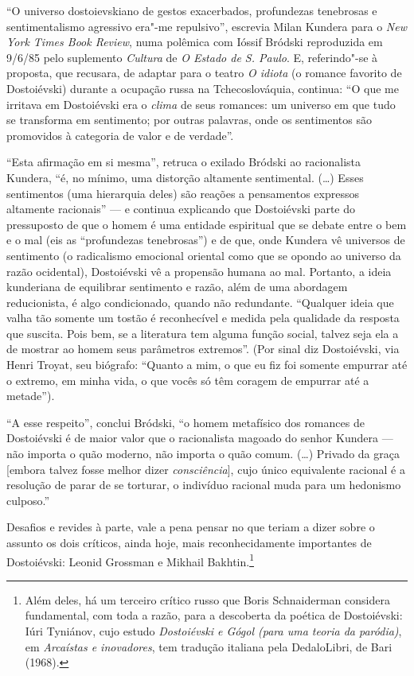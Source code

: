 {{``O universo dostoievskiano de gestos exacerbados, profundezas
tenebrosas e sentimen­talismo agressivo era"-me repulsivo'', escrevia
Milan Kundera para o \emph{New York Times Book Review}, numa polêmica
com Ióssif Bródski reproduzida em 9/6/85 pelo suplemento \emph{Cultura}
de \emph{O Estado de S. Paulo}. E, referindo"-se à proposta, que
recusara, de adaptar para o teatro \emph{O idiota} (o romance favorito
de Dostoiévski) durante a ocupação russa na Tchecoslováquia, continua:
``O que me irritava em Dostoiévski era o \emph{clima} de seus romances:
um universo em que tudo se transforma em sentimento; por outras
palavras, onde os sentimentos são promovidos à categoria de valor e de
verdade''.

``Esta afirmação em si mesma'', retruca o exilado Bródski ao
racionalista Kundera, ``é, no mínimo, uma distorção altamente
sentimental. (\ldots{}) Esses sentimentos (uma hierarquia deles) são reações
a pensamentos expressos altamente racionais'' --- e continua explicando
que Dostoiévski parte do pressuposto de que o homem é uma entidade
espiritual que se debate entre o bem e o mal (eis as ``profundezas
tenebrosas'') e de que, onde Kundera vê universos de sentimento (o
radicalismo emocional oriental como que se opondo ao universo da razão
ocidental), Dostoiévski vê a propensão humana ao mal. Portanto, a ideia
kunderiana de equilibrar sentimento e razão, além de uma abordagem
reducionista, é algo condi­cionado, quando não redundante. ``Qualquer
ideia que valha tão somente um tostão é reconhecível e medida pela
qualidade da resposta que suscita. Pois bem, se a literatura tem alguma
função social, talvez seja ela a de mostrar ao homem seus parâmetros
extremos''. (Por sinal diz Dostoiévski, via Henri Troyat, seu biógrafo:
``Quanto a mim, o que eu fiz foi somente empurrar até o extremo, em
minha vida, o que vocês só têm coragem de empurrar até a metade'').

``A esse respeito'', conclui Bródski, ``o homem metafísico dos romances
de Dostoiévski é de maior valor que o racionalista magoado do senhor
Kundera --- não importa o quão moderno, não importa o quão comum. (\ldots{})
Privado da graça [embora talvez fosse melhor dizer
\emph{consciência}], cujo único equivalente racional é a resolução de
parar de se torturar, o indivíduo racional muda para um hedonismo
culposo.''

Desafios e revides à parte, vale a pena pensar no que teriam a dizer
sobre o assunto os dois críticos, ainda hoje, mais reconhecidamente
importantes de Dostoiévski: Leonid Grossman e Mikhail Bakhtin.\footnote{Além
  deles, há um terceiro crítico russo que Boris Schnaiderman considera
  fundamental, com toda a razão, para a descoberta da poética de
  Dostoiévski: Iúri Tyniánov, cujo estudo \emph{Dostoiévski e Gógol
  (para uma teoria da paródia)}, em \emph{Arcaístas e inovadores}, tem
  tradução italiana pela DedaloLibri, de Bari (1968).}

}}
